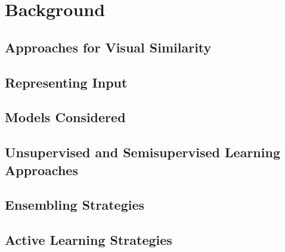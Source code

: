 \chapter{Background}



\section{Approaches for Visual Similarity}
\label{bg_sim}


\section{Representing Input}
\label{data_rep}



\section{Models Considered}
\label{models_considered}


\section{Unsupervised and Semisupervised Learning Approaches}
\label{unsup}


\section{Ensembling Strategies}
\label{bg_ensembling}


\section{Active Learning Strategies}
\label{bg_ensembling}
